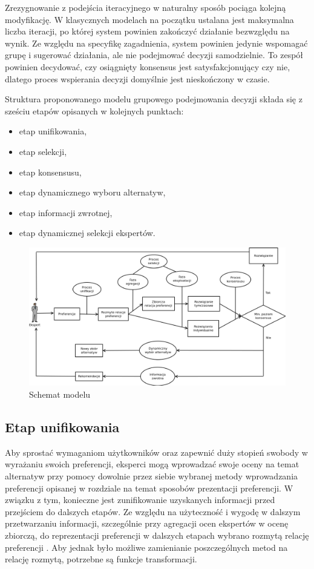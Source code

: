 Zrezygnowanie z podejścia iteracyjnego w naturalny sposób pociąga kolejną
modyfikację. W klasycznych modelach na początku ustalana jest maksymalna liczba
iteracji, po której system powinien zakończyć działanie bezwzględu na wynik.
Ze względu na specyfikę zagadnienia, system powinien jedynie wspomagać grupę i
sugerować działania, ale nie podejmować decyzji samodzielnie. To zespół powinien
decydować, czy osiągnięty konsensus jest satysfakcjonujący czy nie, dlatego
proces wspierania decyzji domyślnie jest nieskończony w czasie.

Struktura proponowanego modelu grupowego podejmowania decyzji składa się z
sześciu etapów opisanych w kolejnych punktach:
\begin{itemize}
  \item etap unifikowania,
  \item etap selekcji,
  \item etap konsensusu,
  \item etap dynamicznego wyboru alternatyw,
  \item etap informacji zwrotnej,
  \item etap dynamicznej selekcji ekspertów.
\end{itemize}

\begin{figure}[!htbp]
  \includegraphics[width=\linewidth]
    {chapters/tdmmodel/model_schema}
  \caption{Schemat modelu}
  \label{fig:model_schema}
\end{figure}

\subsection{Etap unifikowania}
Aby sprostać wymaganiom użytkowników oraz zapewnić duży stopień swobody w
wyrażaniu swoich preferencji, eksperci mogą wprowadzać swoje oceny na temat
alternatyw przy pomocy dowolnie przez siebie wybranej metody wprowadzania
preferencji opisanej w rozdziale na temat sposobów prezentacji preferencji. W
związku z tym, konieczne jest zunifikowanie uzyskanych informacji przed
przejściem do dalszych etapów. Ze względu na użyteczność i wygodę w dalszym
przetwarzaniu informacji, szczególnie przy agregacji ocen ekspertów w ocenę
zbiorczą, do reprezentacji preferencji w dalszych etapach wybrano rozmytą
relację preferencji \cite{Ma2006}. Aby jednak było możliwe zamienianie
poszczególnych metod na relację rozmytą, potrzebne są funkcje transformacji.

